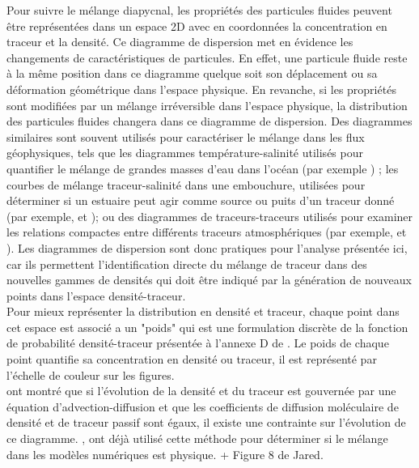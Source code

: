 \documentclass[a4paper,12pt]{article}
\begin{document}
        Pour suivre le mélange diapycnal, les propriétés des particules fluides peuvent être représentées dans un espace 2D avec en coordonnées la concentration en traceur et la densité. 
        Ce diagramme de dispersion met en évidence les changements de caractéristiques de particules. En effet, une particule fluide reste à la même position dans ce diagramme quelque soit son déplacement ou sa déformation géométrique dans l'espace physique. En revanche, si les propriétés sont modifiées par un mélange irréversible dans l'espace physique, la distribution des particules fluides changera dans ce diagramme de dispersion. 
        Des diagrammes similaires sont souvent utilisés pour caractériser le mélange dans les flux géophysiques, tels que les diagrammes température-salinité utilisés pour quantifier le mélange de grandes masses d'eau dans l'océan (par exemple \citep{tomczak_multi-parameter_1981}) ; les courbes de mélange traceur-salinité dans une embouchure, utilisées pour déterminer si un estuaire peut agir comme source ou puits d'un traceur donné (par exemple, \citep{loder_dynamics_1981} et \cite{officer_dynamics_1981}); ou des diagrammes de traceurs-traceurs utilisés pour examiner les relations compactes entre différents traceurs atmosphériques (par exemple, \cite{tilmes_development_2006} et \cite{plumb_tracer_2007}). Les diagrammes de dispersion sont donc pratiques pour l'analyse présentée ici, car ils permettent l'identification directe du mélange de traceur dans des nouvelles gammes de densités
        qui doit être indiqué par la génération de nouveaux points dans l'espace densité-traceur.\\
        Pour mieux représenter la distribution en densité et traceur, chaque point dans cet espace est associé a un "poids" qui est une formulation discrète de la fonction de probabilité densité-traceur présentée à l'annexe D de \cite{plumb_tracer_2007}. Le poids de chaque point quantifie sa concentration en densité ou traceur, il est représenté par l'échelle de couleur sur les figures. \\
        \newline
        \cite{penney_diapycnal_2020} ont montré que si l'évolution de la densité et du traceur est gouvernée par une équation d'advection-diffusion et que les coefficients de diffusion moléculaire de densité et de traceur passif sont égaux, il existe une contrainte sur l'évolution de ce diagramme. \cite{plumb_tracer_2007}, \cite{lauritzen_evaluating_2012} ont déjà utilisé cette méthode pour déterminer si le mélange dans les modèles numériques est physique. 
        + Figure 8 de Jared.
    
\end{document}
